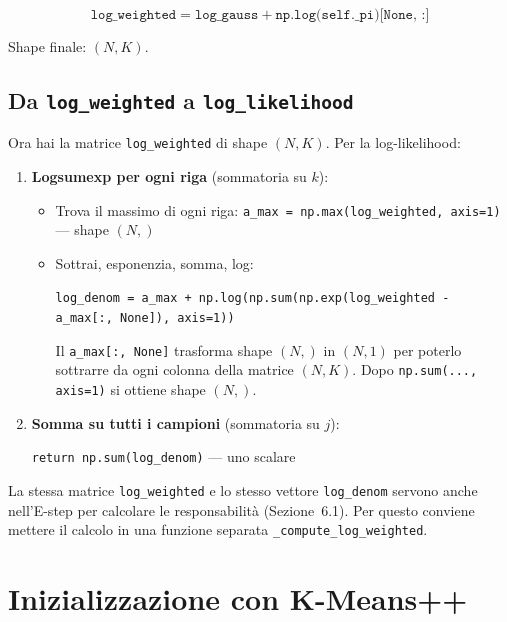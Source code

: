 \documentclass[11pt,a4paper]{article}
\begin{document}
$$\texttt{log\_weighted} = \texttt{log\_gauss} + \texttt{np.log(self.\_pi)[None, :]}$$

Shape finale: $(N, K)$.

\subsection{Da \texttt{log\_weighted} a \texttt{log\_likelihood}}

Ora hai la matrice \texttt{log\_weighted} di shape $(N, K)$. Per la log-likelihood:

\begin{enumerate}
    \item \textbf{Logsumexp per ogni riga} (sommatoria su $k$):
    \begin{itemize}
        \item Trova il massimo di ogni riga: \texttt{a\_max = np.max(log\_weighted, axis=1)} --- shape $(N,)$
        \item Sottrai, esponenzia, somma, log:

        \texttt{log\_denom = a\_max + np.log(np.sum(np.exp(log\_weighted - a\_max[:, None]), axis=1))}

        Il \texttt{a\_max[:, None]} trasforma shape $(N,)$ in $(N, 1)$ per poterlo sottrarre da ogni colonna della matrice $(N, K)$. Dopo \texttt{np.sum(..., axis=1)} si ottiene shape $(N,)$.
    \end{itemize}
    \item \textbf{Somma su tutti i campioni} (sommatoria su $j$):

    \texttt{return np.sum(log\_denom)} --- uno scalare
\end{enumerate}

\begin{tipbox}
La stessa matrice \texttt{log\_weighted} e lo stesso vettore \texttt{log\_denom} servono anche nell'E-step per calcolare le responsabilit\`a (Sezione~6.1). Per questo conviene mettere il calcolo in una funzione separata \texttt{\_compute\_log\_weighted}.
\end{tipbox}

\section{Inizializzazione con K-Means++}
\end{document}
